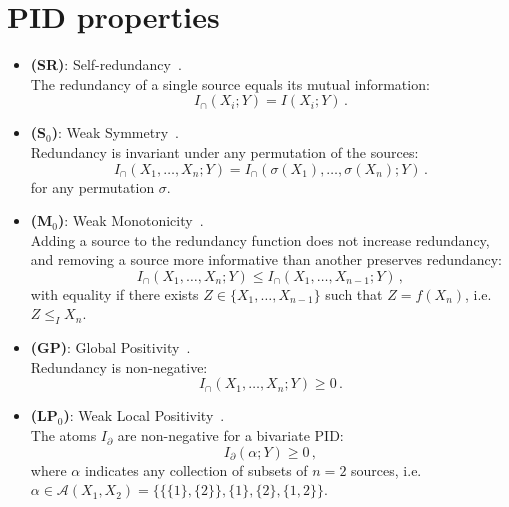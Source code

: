 \documentclass{article}
\newcommand{\ts}[1]{\ensuremath{_{\text{#1}}}}
\newcommand{\Xs}{X_1,\ldots,X_n}
\newcommand{\Xsm}{X_1,\ldots,X_{n-1}}
\newcommand{\Icaps}{\ensuremath{I_\cap(\Xs;Y)}}
\newcommand{\Icapsm}{\ensuremath{I_\cap(X_1,\ldots,X_{n-1};Y)}}
\begin{document}
\section{PID properties}
\label{sec:properties_mathy}
\begin{itemize}
    \item \textbf{(SR)}: Self-redundancy~\cite{williams2010nonnegative}. \\
    The redundancy of a single source equals its mutual information:
    \begin{equation} \label{ax:SR}
        I_\cap(X_i;Y) = I(X_i;Y) \,.
    \end{equation}

    \item \textbf{(S\ts{0})}: Weak Symmetry~\cite{williams2010nonnegative}. \\
    Redundancy is invariant under any permutation of the sources:
    \begin{equation}\label{ax:S0}
        \Icaps = I_\cap(\sigma(X_1),\ldots,\sigma(X_n);Y) \,.
    \end{equation}
    for any permutation $\sigma$.
    
    \item \textbf{(M\ts{0})}: Weak Monotonicity~\cite{williams2010nonnegative}. \\
    Adding a source to the redundancy function does not increase redundancy, and removing a source more informative than another preserves redundancy:
    \begin{equation}\label{ax:M0}
        \Icaps \leq \Icapsm \,,
    \end{equation}
    with equality if there exists $Z\in\{\Xsm\}$ such that $Z=f(X_n)$, i.e.\ $Z\leq_I X_n$.

    \item \textbf{(GP)}: Global Positivity~\cite{williams2010nonnegative}. \\
    Redundancy is non-negative:
    \begin{equation}\label{ax:GP}
        \Icaps\ge0 \,.
    \end{equation}

    \item \textbf{(LP\ts{0})}: Weak Local Positivity~\cite{williams2010nonnegative}. \\
    The atoms $I_\partial$ are non-negative for a bivariate PID:
    \begin{equation}\label{ax:LP0}
        I_\partial(\alpha;Y)\ge0\,,
    \end{equation}
    where $\alpha$ indicates any collection of subsets of $n=2$ sources, i.e.\ $\alpha\in\mathcal{A}(X_1,X_2)=\{\{\{1\},\{2\}\},\{1\},\{2\},\{1,2\}\}$.


\end{itemize}
\end{document}
